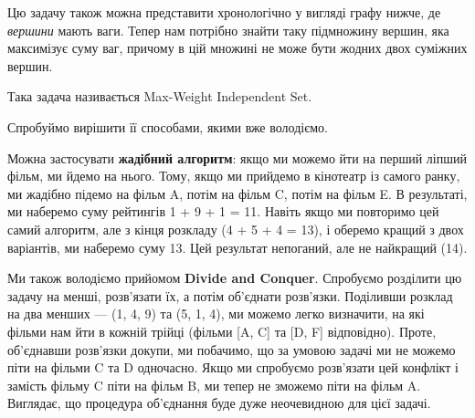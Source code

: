 \documentclass[12pt,a4paper]{report}
\begin{document}
Цю задачу також можна представити хронологічно у вигляді графу нижче, де \emph{вершини} мають ваги. Тепер нам потрібно знайти таку підмножину вершин, яка максимізує суму ваг, причому в цій множині не може бути жодних двох суміжних вершин.

\begin{center}
\end{center}

Така задача називається Max-Weight Independent Set.

Спробуймо вирішити її способами, якими вже володіємо.

Можна застосувати \textbf{жадібний алгоритм}: якщо ми можемо йти на перший ліпший фільм, ми йдемо на нього. Тому, якщо ми прийдемо в кінотеатр із самого ранку, ми жадібно підемо на фільм A, потім на фільм C, потім на фільм E. В результаті, ми наберемо суму рейтингів 1 + 9 + 1 = 11. Навіть якщо ми повторимо цей самий алгоритм, але з кінця розкладу (4 + 5 + 4 = 13), і оберемо кращий з двох варіантів, ми наберемо суму 13. Цей результат непоганий, але не найкращий (14).

Ми також володіємо прийомом \textbf{Divide and Conquer}. Спробуємо розділити цю задачу на менші, розв’язати їх, а потім об’єднати розв’язки. Поділивши розклад на два менших --- (1, 4, 9) та (5, 1, 4), ми можемо легко визначити, на які фільми нам йти в кожній трійці (фільми [A, C] та [D, F] відповідно). Проте, об’єднавши розв’язки докупи, ми побачимо, що за умовою задачі ми не можемо піти на фільми C та D одночасно. Якщо ми спробуємо розв’язати цей конфлікт і замість фільму C піти на фільм B, ми тепер не зможемо піти на фільм A. Виглядає, що процедура об’єднання буде дуже неочевидною для цієї задачі.
\end{document}
